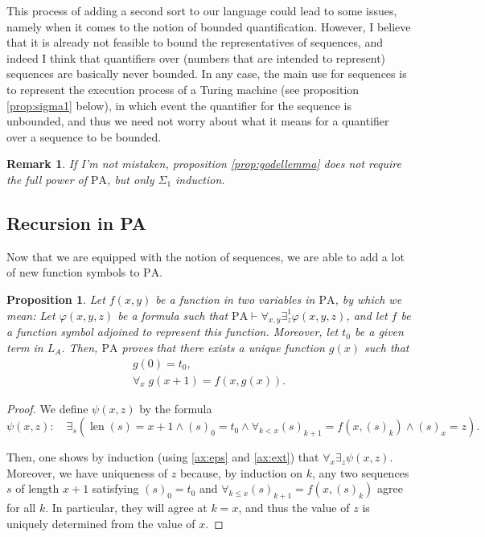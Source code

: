 \documentclass{article}
\newtheorem{prop}[theorem]{Proposition}
\newtheorem{remark}[theorem]{Remark}
\theoremstyle{nonumberplain}
\newtheorem{proof}{Proof}
\newcommand{\LA}{L_A}
\newcommand{\PA}{\mathrm{PA}}
\DeclareMathOperator{\len}{len}
\begin{document}
This process of adding a second sort to our language could lead to some issues, namely when it comes to the notion of bounded quantification. However, I believe that it is already not feasible to bound the representatives of sequences, and indeed I think that quantifiers over (numbers that are intended to represent) sequences are basically never bounded. In any case, the main use for sequences is to represent the execution process of a Turing machine (see proposition \ref{prop:sigma1} below), in which event the quantifier for the sequence is unbounded, and thus we need not worry about what it means for a quantifier over a sequence to be bounded.

\begin{remark}
If I'm not mistaken, proposition \ref{prop:godellemma} does not require the full power of $\PA$, but only $\Sigma_1$ induction.
\end{remark} 

\subsection{Recursion in PA}

Now that we are equipped with the notion of sequences, we are able to add a lot of new function symbols to $\PA$.

\begin{prop}\label{prop:recursion1}
Let $f(x, y)$ be a function in two variables in $\PA$, by which we mean: Let $\varphi(x,y,z)$ be a formula such that $\PA \vdash \forall_{x, y} \exists^1_z \varphi(x,y,z)$, and let $f$ be a function symbol adjoined to represent this function. Moreover, let $t_0$ be a given term in $\LA$. Then, $\PA$ proves that there exists a unique function $g(x)$ such that
\begin{gather}
g(0) = t_0,\\
\forall_x \; g(x+1) = f(x, g(x)).
\end{gather}
\end{prop}

\begin{proof}
We define $\psi(x,z)$ by the formula
\begin{equation}
\psi(x,z) \colon \quad \exists_s (\len(s) = x+1 \land (s)_0 = t_0 \land \forall_{k < x} (s)_{k+1} = f(x, (s)_k) \land (s)_x = z).
\end{equation}

Then, one shows by induction (using \eqref{ax:eps} and \eqref{ax:ext}) that $\forall_x \exists_z \psi(x,z)$. Moreover, we have uniqueness of $z$ because, by induction on $k$, any two sequences $s$ of length $x+1$ satisfying $(s)_0 = t_0$ and $\forall_{k \leq x} (s)_{k+1} = f(x, (s)_k)$ agree for all $k$. In particular, they will agree at $k = x$, and thus the value of $z$ is uniquely determined from the value of $x$.
\end{proof}
\end{document}
